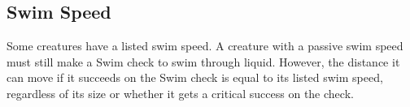     \subsection{Swim Speed}\label{Swim Speed}
        Some creatures have a listed swim speed.
        A creature with a passive swim speed must still make a Swim check to swim through liquid.
        However, the distance it can move if it succeeds on the Swim check is equal to its listed swim speed, regardless of its size or whether it gets a critical success on the check.
